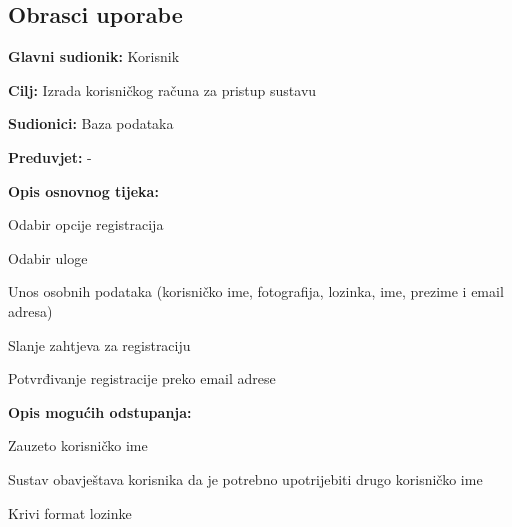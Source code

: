 			
			\eject 
			
			
				
			\subsection{Obrasci uporabe}
				
					
					\noindent {}
					\begin{packed_item}
						
						\item \textbf{Glavni sudionik: }Korisnik
						\item  \textbf{Cilj:} Izrada korisničkog računa za pristup sustavu
						\item  \textbf{Sudionici:} Baza podataka
						\item  \textbf{Preduvjet:} -
						\item  \textbf{Opis osnovnog tijeka:}
						
						\item[] \begin{packed_enum}
							
							\item Odabir opcije registracija
							\item Odabir uloge
							\item Unos osobnih podataka (korisničko ime, fotografija, lozinka, ime, prezime i email adresa)
							\item Slanje zahtjeva za registraciju
							\item Potvrđivanje registracije preko email adrese
						
								\end{packed_enum}
								
						\item  \textbf{Opis mogućih odstupanja:}
						
						\item[] \begin{packed_item}
							
							\item[3.a] Zauzeto korisničko ime
							\begin{packed_enum}
								
								\item Sustav obavještava korisnika da je potrebno upotrijebiti drugo korisničko ime
								
								\end{packed_enum}
							
							\item[3.b] Krivi format lozinke \begin{packed_enum}
								

\end{packed_enum}
\end{packed_item}
\end{packed_item}
